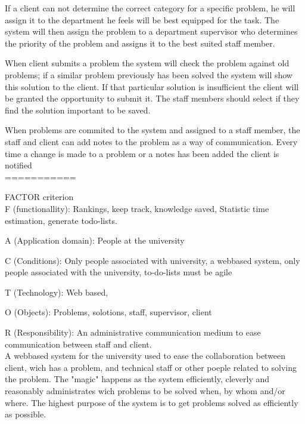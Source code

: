 If a client can not determine the correct category for a specific problem, he will assign it to the department he feels will be best equipped for the task. The system will then assign the problem to a department supervisor who determines the priority of the problem and assigns it to the best suited staff member. 

When client submits a problem the system will check the problem against old problems; if a similar problem previously has been solved the system will show this solution to the client. If that particular solution is insufficient the client will be granted the opportunity to submit it. The staff members should select if they find the solution important to be saved.

When problems are commited to the system and assigned to a staff member, the staff and client can add notes to the problem as a way of communication. Every time a change is made to a problem or a notes has been added the client is notified\\
===========





FACTOR criterion\\
F (functionallity): Rankings, keep track, knowledge saved, Statistic time estimation, generate todo-lists.

A (Application domain): People at the university

C (Conditions): Only people associated with university, a webbased system, only people associated with the university, to-do-lists must be agile

T (Technology): Web based, 

O (Objects): Problems, solotions, staff, supervisor, client

R (Responsibility): An administrative communication medium to ease communication between staff and client.\\










A webbased system for the university used to ease the collaboration between client, wich has a problem, and technical staff or other poeple related to solving the problem. The "magic" happens as the system efficiently, cleverly and reasonably administrates wich problems to be solved when, by whom and/or where. The highest purpose of the system is to get problems solved as efficiently as possible.\\



